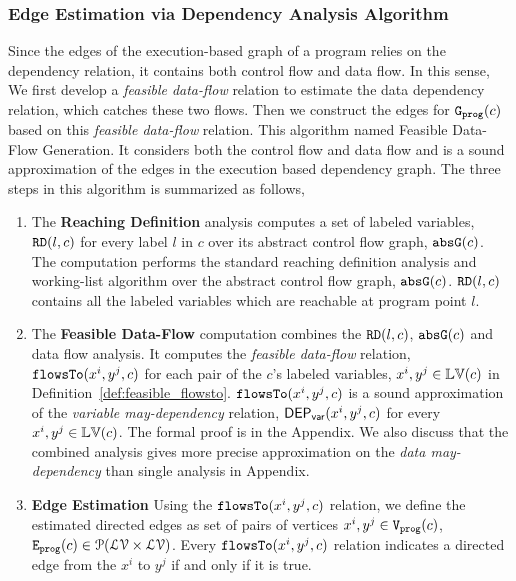 \subsubsection{Edge Estimation via Dependency Analysis Algorithm}
\label{sec:alg_edgegen}
Since the edges of the execution-based graph of a program relies on the dependency relation, it contains both control flow and data flow. 
In this sense, We first develop a \emph{feasible data-flow} relation to estimate the data dependency relation, which catches these two flows.
Then we construct the edges for $\mathtt{{G_{prog}}}(c)$ based on this \emph{feasible data-flow} relation.
This algorithm named Feasible Data-Flow Generation. It 
considers both the control flow and data flow and
is a sound approximation of the edges in the execution based dependency graph.
The three steps in this algorithm is summarized as follows,
\begin{enumerate}
  \item The \textbf{Reaching Definition} analysis computes a set of labeled variables, $\mathtt{RD}(l, c)$ for every label $l$ in $c$
  over its abstract control flow graph, $\mathtt{abs}{\mathtt{G}}(c)$.
  The computation performs the standard reaching definition analysis and working-list algorithm over the abstract control flow graph, $\mathtt{abs}{\mathtt{G}}(c)$. 
  $\mathtt{RD}(l, c)$ contains all the labeled variables which are reachable at program point $l$. 
  \item The \textbf{Feasible Data-Flow} computation combines the $\mathtt{RD}(l, c)$, $\mathtt{abs}{\mathtt{G}}(c)$ and data flow analysis. 
  It computes the \emph{feasible data-flow} relation,
  $\mathtt{flowsTo}(x^i, y^j, c)$ for each pair of the $c$'s labeled variables, $x^i, y^j \in \mathbb{LV}(c)$ in Definition~\ref{def:feasible_flowsto}. $\mathtt{flowsTo}(x^i, y^j, c)$ is a sound approximation 
  of the \emph{variable may-dependency} relation, $\mathsf{DEP_{var}}(x^i, y^j, c)$ for every $x^i, y^j \in \mathbb{LV}(c)$.
  The formal proof is in the Appendix. We also discuss that the combined analysis gives more precise approximation on the \emph{data may-dependency} than single analysis in Appendix.
\item \textbf{Edge Estimation}
Using the $\mathtt{flowsTo}(x^i, y^j, c)$ relation, we define the estimated directed edges
as set of pairs of vertices $x^i, y^j\in \mathtt{{V_{prog}}}(c)$,
$\mathtt{{E_{prog}}}(c) \in \mathcal{P}( \mathcal{LV} \times \mathcal{LV})$.
Every $\mathtt{flowsTo}(x^i, y^j, c)$ relation indicates a directed edge from the $x^i$ to $y^j$ if and only if it is true.
\end{enumerate} 
